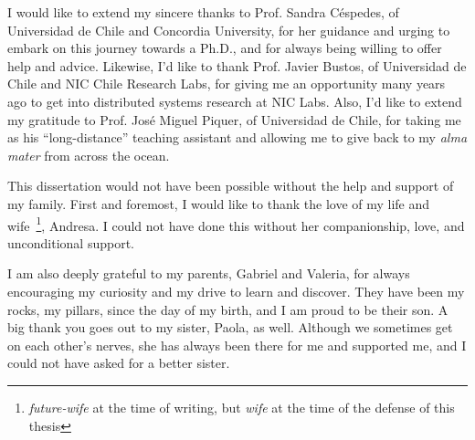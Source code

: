 I would like to extend my sincere thanks to Prof. Sandra Céspedes, of Universidad de Chile and Concordia University, for her guidance and urging to embark on this journey towards a Ph.D., and for always being willing to offer help and advice.
Likewise, I'd like to thank Prof. Javier Bustos, of Universidad de Chile and NIC Chile Research Labs, for giving me an opportunity many years ago to get into distributed systems research at NIC Labs.
Also, I'd like to extend my gratitude to Prof. José Miguel Piquer, of Universidad de Chile, for taking me as his ``long-distance'' teaching assistant and allowing me to give back to my \emph{alma mater} from across the ocean.

\medskip

This dissertation would not have been possible without the help and support of my family.
First and foremost, I would like to thank the love of my life and wife~\footnote{\emph{future-wife} at the time of writing, but \emph{wife} at the time of the defense of this thesis}, Andresa.
I could not have done this without her companionship, love, and unconditional support.

I am also deeply grateful to my parents, Gabriel and Valeria, for always encouraging my curiosity and my drive to learn and discover.
They have been my rocks, my pillars, since the day of my birth, and I am proud to be their son.
A big thank you goes out to my sister, Paola, as well.
Although we sometimes get on each other's nerves, she has always been there for me and supported me, and I could not have asked for a better sister.


